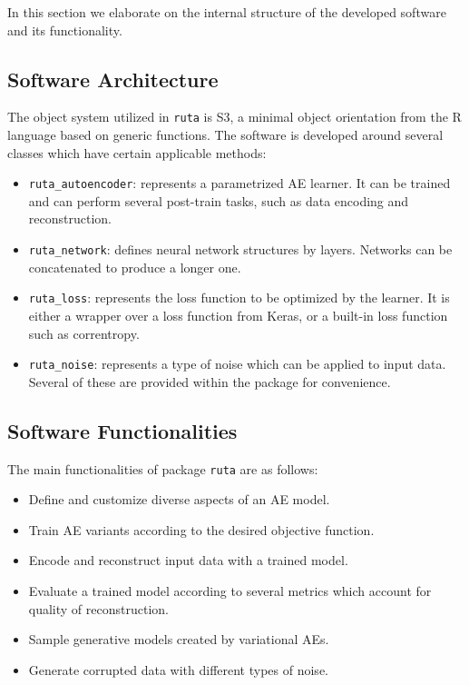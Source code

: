 In this section we elaborate on the internal structure of the developed software and its functionality.

\subsection{Software Architecture}
\label{p2sec.architecture}


The object system utilized in \texttt{ruta} is S3, a minimal object orientation from the R language based on generic functions. The software is developed around several classes which have certain applicable methods:

  \begin{itemize}
  \item \texttt{ruta\_autoencoder}: represents a parametrized AE learner. It can be trained and can perform several post-train tasks, such as data encoding and reconstruction.
  \item \texttt{ruta\_network}: defines neural network structures by layers. Networks can be concatenated to produce a longer one.
  \item \texttt{ruta\_loss}: represents the loss function to be optimized by the learner. It is either a wrapper over a loss function from Keras, or a built-in loss function such as correntropy.
  \item \texttt{ruta\_noise}: represents a type of noise which can be applied to input data. Several of these are provided within the package for convenience.
  \end{itemize}


  
\subsection{Software Functionalities}
\label{p2sec.functionality}

The main functionalities of package \texttt{ruta} are as follows:

\begin{itemize}
  \item Define and customize diverse aspects of an AE model.
\item Train AE variants according to the desired objective function.
\item Encode and reconstruct input data with a trained model.
\item Evaluate a trained model according to several metrics which account for quality of reconstruction.
\item Sample generative models created by variational AEs.
  \item Generate corrupted data with different types of noise.
\end{itemize}

